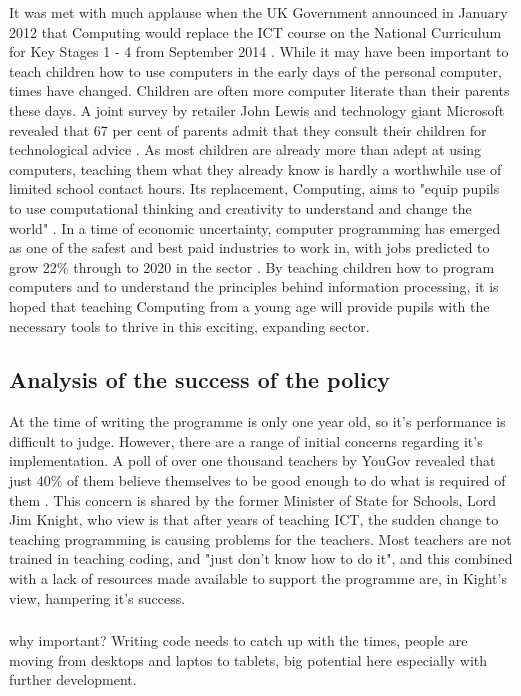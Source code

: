 \documentclass[ %
                    author={Jonathan Rankin},
                supervisor={Dr. David May, Dr. Ian Holyer},
                    degree={MEng},
                     title={CodeTouch},
                  subtitle={A Revolutionary Way To Program Real Code On Touch Screen Devices},
                      type={enterprise},
                      year={2015 } ]{dissertation}
\begin{document}
It was met with much applause when the UK Government announced in January 2012 that Computing would replace the ICT course on the National Curriculum for Key Stages 1 - 4 from September 2014 \cite{BBCITCstory}. While it may have been important to teach children how to use computers in the early days of the personal computer, times have changed. Children are often more computer literate than their parents these days. A joint survey by retailer John Lewis and technology giant Microsoft revealed that 67 per cent of parents admit that they consult their children for technological advice \cite{TwoThirds}. As most children are already more than adept at using computers, teaching them what they already know is hardly a worthwhile use of limited school contact hours. Its replacement, Computing, aims to "equip pupils to use computational thinking and creativity to understand and change the world" \cite{ComputingCurric}. In a time of economic uncertainty, computer programming has emerged as one of the safest and best paid industries to work in, with jobs predicted to grow 22\% through to 2020 in the sector \cite{22percent}.  By teaching children how to program computers and to understand the principles behind information processing, it is hoped that teaching Computing from a young age will provide pupils with the necessary tools to thrive in this exciting, expanding sector.  

\subsection{Analysis of the success of the policy}

At the time of writing the programme is only one year old, so it's performance is difficult to judge. However, there are a range of initial concerns regarding it's implementation. A poll of over one thousand teachers by YouGov revealed that just 40\% of them believe themselves to be good enough to do what is required of them \cite{IBtimesGrowingGap}. This concern is shared by the former Minister of State for Schools, Lord Jim Knight, who view is that after years of teaching ICT, the sudden change to teaching programming is causing problems for the teachers. Most teachers are not trained in teaching coding, and "just don't know how to do it", and this combined with a lack of resources made available to support the programme are, in Kight's view, hampering it's success\cite{IBTimesCurric}.

\subsubsection{}
why important? Writing code needs to catch up with the times, people are moving from desktops and laptos to tablets, big potential here especially with further development. 
\end{document}
